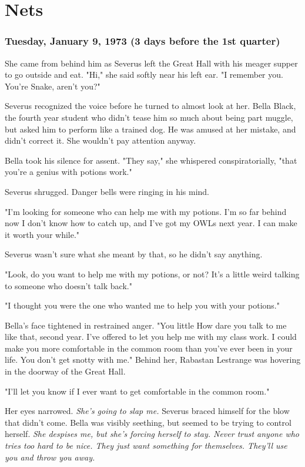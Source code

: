 
\chapter{Nets}

\subsection{Tuesday, January 9, 1973 (3 days before the 1st quarter)}

She came from behind him as Severus left the Great Hall with his meager supper to go outside and eat. "Hi," she said softly near his left ear. "I remember you. You're Snake, aren't you?"

Severus recognized the voice before he turned to almost look at her. Bella Black, the fourth year student who didn't tease him so much about being part muggle, but asked him to perform like a trained dog. He was amused at her mistake, and didn't correct it. She wouldn't pay attention anyway.

Bella took his silence for assent. "They say," she whispered conspiratorially, "that you're a genius with potions work."

Severus shrugged. Danger bells were ringing in his mind.

"I'm looking for someone who can help me with my potions. I'm so far behind now I don't know how to catch up, and I've got my OWLs next year. I can make it worth your while."

Severus wasn't sure what she meant by that, so he didn't say anything.

"Look, do you want to help me with my potions, or not? It's a little weird talking to someone who doesn't talk back."

"I thought you were the one who wanted me to help you with your potions."

Bella's face tightened in restrained anger. "You little{\el} How dare you talk to me like that, second year. I've offered to let you help me with my class work. I could make you more comfortable in the common room than you've ever been in your life. You don't get snotty with me." Behind her, Rabastan Lestrange was hovering in the doorway of the Great Hall.

"I'll let you know if I ever want to get comfortable in the common room."

Her eyes narrowed. \emph{She's going to slap me.} Severus braced himself for the blow that didn't come. Bella was visibly seething, but seemed to be trying to control herself. \emph{She despises me, but she's forcing herself to stay. Never trust anyone who tries too hard to be nice. They just want something for themselves. They'll use you and throw you away.}

